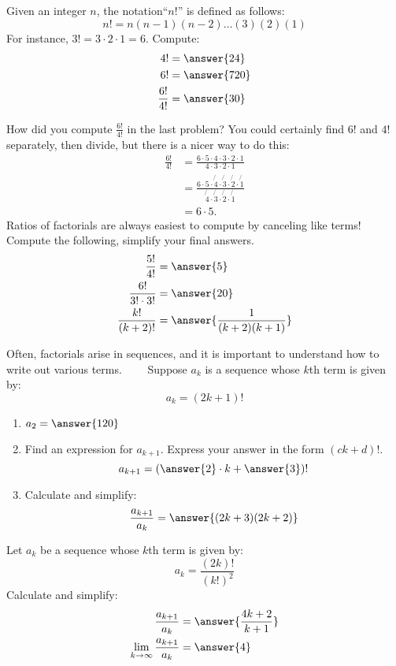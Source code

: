 \documentclass{ximera}
\begin{document}
\begin{problem}
  Given an integer $n$, the notation​ ``$n!$'' is defined as​ follows:
  \[
  n! = n(n-1)(n-2)\dots (3)(2)(1)
  \]
  For instance, $3!=3\cdot2\cdot 1 = 6$. Compute:
  \begin{align*}
    4! &= \answer{24}\\
    6! &= \answer{720}\\
    \frac{6!}{4!} &= \answer{30}
  \end{align*}
  \begin{problem}
    How did you compute $\frac{6!}{4!}$ in the last problem? You could
    certainly find $6!$ and $4!$ separately, then​ divide, but there is
    a nicer way to do​ this:
    \begin{align*}
      \frac{6!}{4!} &= \frac{6\cdot5\cdot4\cdot3\cdot2\cdot1}{4\cdot3\cdot2\cdot1}\\
      &=\frac{6\cdot5\cdot\not{4}\cdot\not{3}\cdot\not{2}\cdot\not{1}}{\not{4}\cdot\not{3}\cdot\not{2}\cdot\not{1}}\\
      &= 6\cdot 5.
    \end{align*}
    Ratios of factorials are always easiest to compute by canceling
    like​ terms! Compute the following, simplify your final answers.
    \begin{align*}
      \frac{5!}{4!} &= \answer{5}\\
      \frac{6!}{3!\cdot 3!} &= \answer{20}\\
      \frac{k!}{(k+2)!}  &=\answer{\frac{1}{(k+2)(k+1)}}
    \end{align*}
  \end{problem}
\end{problem}

\begin{problem}
  ​Often, factorials arise in​ sequences, and it is important to
  understand how to write out various terms.   Suppose $a_k$ is a
  sequence whose $k$th term is given​ by:
  \[
  a_k = (2k+1)!
  \]
  \begin{enumerate}
  \item $a_2 = \answer{120}$
  \item Find an expression for $a_{k+1}$. Express your answer in the form $(ck+d)!$.
    \[
    a_{k+1} = \left(\answer{2} \cdot k + \answer{3}\right)!
    \]
  \item Calculate and simplify:
    \[
    \frac{a_{k+1}}{a_k} = \answer{(2k+3)(2k+2)}
    \]
  \end{enumerate}
\end{problem}

\begin{problem}
  Let $a_k$ be a sequence whose $k$th term is given​ by:
  \[
  a_k = \frac{(2k)!}{(k!)^2}
  \]
  Calculate and simplify:
  \begin{align*}
    \frac{a_{k+1}}{a_k} &= \answer{\frac{4k+2}{k+1}}\\
    \lim_{k\to\infty} \frac{a_{k+1}}{a_k} &= \answer{4}
  \end{align*}
\end{problem}
\end{document}
